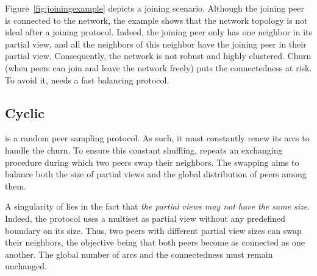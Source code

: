 \begin{figure*}
  \centering
  \subfloat[Figure A][Subscription]{
    }
  \hspace{40pt}
  \subfloat[Figure B][Forwarding]{
    }
  \hspace{40pt}
  \subfloat[Figure C][Connections]{
    }
  \caption{\label{fig:joiningexample}Example of the \SCAMPLON{}'s joining
    protocol. In this scenario, Peer $p_1$ contacts $p_2$ to join the network
    composed of $\{p_2,\,p_3,\,p_4,\,p_5,\,p_6\}$ (for simplicity sake, only
    the new arcs and the neighborhood of $p_1$ and $p_2$ are displayed). Peer
    $p_1$ directly adds $p_2$ in its partial view. Peer $p_2$ forwards the
    identity of $p_1$ to its neighborhood. Each of these neighbors adds $p_1$
    in their partial view. Five connections have been established.}
\end{figure*}

Figure~\ref{fig:joiningexample} depicts a joining scenario. Although the
joining peer is connected to the network, the example shows that the network
topology is not ideal after a joining protocol. Indeed, the joining peer only
has one neighbor in its partial view, and all the neighbors of this neighbor
have the joining peer in their partial view. Consequently, the network is not
robust and highly clustered. Churn (when peers can join and leave the network
freely) puts the connectedness at risk. To avoid it, \SCAMPLON{} needs a fast
balancing protocol.

\subsection{Cyclic}
\label{subsec:cyclic}

\SCAMPLON{} is a random peer sampling protocol. As such, it must constantly
renew its arcs to handle the churn.  To ensure this constant shuffling,
\SCAMPLON{} repeats an exchanging procedure during which two peers swap their
neighbors. The swapping aims to balance both the size of partial views and the
global distribution of peers among them.

A singularity of \SCAMPLON{} lies in the fact that \emph{the partial views may
  not have the same size}. Indeed, the protocol uses a multiset as partial view
without any predefined boundary on its size. Thus, two peers with different
partial view sizes can swap their neighbors, the objective being that both
peers become as connected as one another. The global number of arcs and the
connectedness must remain unchanged.

